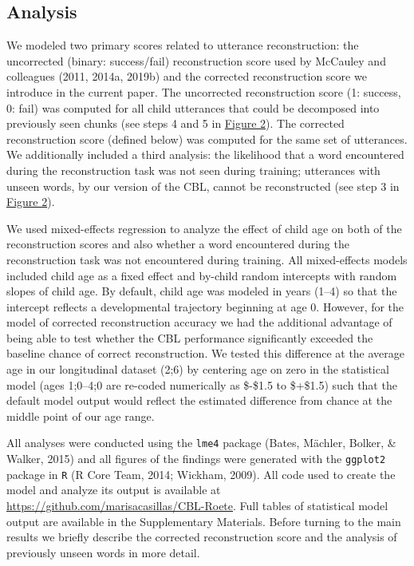 \documentclass[
  english,
  man,floatsintext]{apa6}
\begin{document}
\hypertarget{analysis}{%
\subsection{Analysis}\label{analysis}}

We modeled two primary scores related to utterance reconstruction: the uncorrected (binary: success/fail) reconstruction score used by McCauley and colleagues (2011, 2014a, 2019b) and the corrected reconstruction score we introduce in the current paper. The uncorrected reconstruction score (1: success, 0: fail) was computed for all child utterances that could be decomposed into previously seen chunks (see steps 4 and 5 in \protect\hyperlink{fig2}{Figure 2}). The corrected reconstruction score (defined below) was computed for the same set of utterances. We additionally included a third analysis: the likelihood that a word encountered during the reconstruction task was not seen during training; utterances with unseen words, by our version of the CBL, cannot be reconstructed (see step 3 in \protect\hyperlink{fig2}{Figure 2}).

We used mixed-effects regression to analyze the effect of child age on both of the reconstruction scores and also whether a word encountered during the reconstruction task was not encountered during training. All mixed-effects models included child age as a fixed effect and by-child random intercepts with random slopes of child age. By default, child age was modeled in years (1--4) so that the intercept reflects a developmental trajectory beginning at age 0. However, for the model of corrected reconstruction accuracy we had the additional advantage of being able to test whether the CBL performance significantly exceeded the baseline chance of correct reconstruction. We tested this difference at the average age in our longitudinal dataset (2;6) by centering age on zero in the statistical model (ages 1;0--4;0 are re-coded numerically as \$-\$1.5 to \$+\$1.5) such that the default model output would reflect the estimated difference from chance at the middle point of our age range.

All analyses were conducted using the \texttt{lme4} package (Bates, Mächler, Bolker, \& Walker, 2015) and all figures of the findings were generated with the \texttt{ggplot2} package in \texttt{R} (R Core Team, 2014; Wickham, 2009). All code used to create the model and analyze its output is available at \href{}{https://github.com/marisacasillas/CBL-Roete}. Full tables of statistical model output are available in the Supplementary Materials. Before turning to the main results we briefly describe the corrected reconstruction score and the analysis of previously unseen words in more detail.
\end{document}
